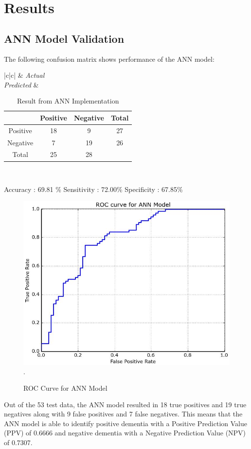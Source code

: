\documentclass[journal,twoside]{IEEEtran}
\begin{document}
\section{Results}
\subsection{ANN Model Validation}
\noindent The following confusion matrix shows performance of the ANN model: \newline
\begin{table}[h!]
	\centering
	\begin{tabular}{|c|c|}
  		\hline
  		& \emph{Actual} \\
  		\hline
  		\emph{Predicted} & 
  		\begin{tabular}{c |c c c}
    	& Positive & Negative & Total \\
     	\hline
    	Positive & 18 & 9 & 27 \\
      	Negative & 7 & 19 & 26 \\
      	Total & 25 & 28 &  \\
		\end{tabular}
 		\\
  	\hline
	\end{tabular}
	\caption{Result from ANN Implementation}
\end{table}
\newline Accuracy : 69.81 \% 
\newline Sensitivity : 72.00\%
\newline Specificity : 67.85\%
\begin{figure}[h!]
\centering
\includegraphics[scale=.32]{ANN_ROC.png}
\DeclareGraphicsExtensions.
\caption{ROC Curve for ANN Model}
\end{figure}
\newline
\par Out of the 53 test data, the ANN model resulted in 18 true positives and 19 true negatives along with 9 false positives and 7 false negatives. This means that the ANN model is able to identify positive dementia with a Positive Prediction Value (PPV) of 0.6666 and negative dementia with a Negative Prediction Value (NPV) of 0.7307.
\end{document}
